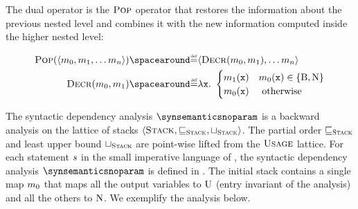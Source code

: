 The dual operator is the $\textup{\textsc{Pop}}$ operator that restores the information about the previous nested level and combines it with the new information computed inside the higher nested level:

\begin{align*}
  \usagepop(\stacktupleinit) &\DefeQ \stacktuple[]{\usagedecr(\usagemap_0, \usagemap_1)} \\
  \usagedecr(\usagemap_0, \usagemap_1) &\DefeQ \lambda \defvariable.\spacer \begin{cases}
    \usagemap_1(\defvariable) & \usagemap_0(\defvariable) \in \{ \belowtag, \unusedtag \} \\
    \usagemap_0(\defvariable) & \text{ otherwise}
  \end{cases}
\end{align*}

The syntactic dependency analysis $\synsemanticsnoparam$ is a backward analysis on the lattice of stacks $\langle\textsc{Stack}, \sqsubseteq_{\textsc{Stack}},\sqcup_{\textsc{Stack}}\rangle$. The partial order $\sqsubseteq_{\textsc{Stack}}$ and least upper bound $\sqcup_{\textsc{Stack}}$ are point-wise lifted from the $\textsc{Usage}$ lattice. For each statement $s$ in the small imperative language of , the syntactic dependency analysis $\synsemanticsnoparam$ is defined in .
The initial stack contains a single map $m_0$ that maps all the output variables to $\textup{U}$ (entry invariant of the analysis) and all the others to $\textup{N}$.
We exemplify the analysis below.

